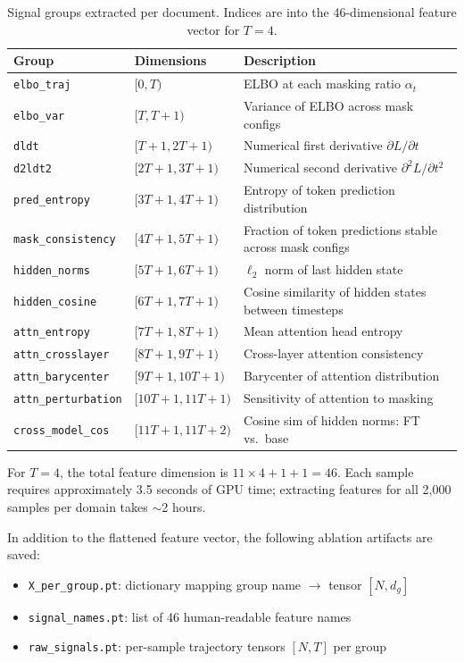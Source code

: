 \documentclass[11pt,a4paper]{article}
\begin{document}
\begin{table}[H]
\centering
\caption{Signal groups extracted per document. Indices are into the 46-dimensional feature vector for $T=4$.}
\begin{tabular}{lll}
\toprule
\textbf{Group} & \textbf{Dimensions} & \textbf{Description} \\
\midrule
\texttt{elbo\_traj}     & $[0, T)$             & ELBO at each masking ratio $\alpha_t$ \\
\texttt{elbo\_var}      & $[T, T{+}1)$         & Variance of ELBO across mask configs \\
\texttt{dldt}           & $[T{+}1, 2T{+}1)$   & Numerical first derivative $\partial L / \partial t$ \\
\texttt{d2ldt2}         & $[2T{+}1, 3T{+}1)$  & Numerical second derivative $\partial^2 L / \partial t^2$ \\
\texttt{pred\_entropy}  & $[3T{+}1, 4T{+}1)$  & Entropy of token prediction distribution \\
\texttt{mask\_consistency} & $[4T{+}1, 5T{+}1)$ & Fraction of token predictions stable across mask configs \\
\texttt{hidden\_norms}  & $[5T{+}1, 6T{+}1)$  & $\ell_2$ norm of last hidden state \\
\texttt{hidden\_cosine} & $[6T{+}1, 7T{+}1)$  & Cosine similarity of hidden states between timesteps \\
\texttt{attn\_entropy}  & $[7T{+}1, 8T{+}1)$  & Mean attention head entropy \\
\texttt{attn\_crosslayer} & $[8T{+}1, 9T{+}1)$ & Cross-layer attention consistency \\
\texttt{attn\_barycenter} & $[9T{+}1, 10T{+}1)$ & Barycenter of attention distribution \\
\texttt{attn\_perturbation} & $[10T{+}1, 11T{+}1)$ & Sensitivity of attention to masking \\
\texttt{cross\_model\_cos} & $[11T{+}1, 11T{+}2)$ & Cosine sim of hidden norms: FT vs.\ base \\
\bottomrule
\end{tabular}
\end{table}

For $T=4$, the total feature dimension is $11 \times 4 + 1 + 1 = 46$.
Each sample requires approximately 3.5 seconds of GPU time;
extracting features for all 2{,}000 samples per domain takes $\sim$2 hours.

In addition to the flattened feature vector, the following ablation artifacts
are saved:
\begin{itemize}[nosep]
  \item \texttt{X\_per\_group.pt}: dictionary mapping group name $\to$ tensor $[N, d_g]$
  \item \texttt{signal\_names.pt}: list of 46 human-readable feature names
  \item \texttt{raw\_signals.pt}: per-sample trajectory tensors $[N, T]$ per group
\end{itemize}
\end{document}

